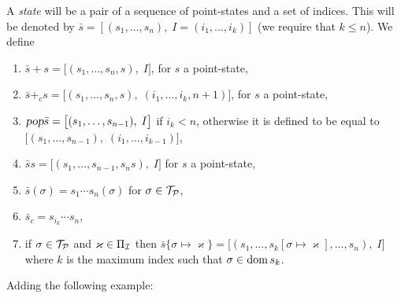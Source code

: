 \documentclass{llncs}
\newcommand{\ari}[1]{{\begin{mdframed}[linecolor=blue]{\color{blue}#1}\end{mdframed}}}
\begin{document}
A \textit{state} will be a pair of a sequence of point-states and a set of indices.
This will be denoted by $\bar s=[(s_1,\dots,s_n),\;I=(i_1,\dots,i_k)]$ (we require that $k\leq n$).
We define
\begin{enumerate}
    \item $\bar s+s=\bigl[(s_1,\dots,s_n,s),\;I\bigr]$, for $s$ a point-state,
    \item $\bar s+_cs=\bigl[(s_1,\dots,s_n,s),\;(i_1,\dots,i_k,n+1)\bigr]$, for $s$ a point-state,
    \item $\textsl{pop}\bar s=\bigl[(s_1,\dots,s_{n-1}),\;I\bigr]$ if $i_k<n$, otherwise it is defined to be equal to $\bigl[(s_1,\dots,s_{n-1}),\;(i_1,\dots,i_{k-1})\bigr]$,
    \item $\bar ss=\bigl[(s_1,\dots,s_{n-1},s_ns),\;I\bigr]$ for $s$ a point-state,
    \item $\bar s(\sigma)=s_1\cdots s_n(\sigma)$ for $\sigma\in\mathcal T_{\mathcal P}$,
    \item $\bar s_c=s_{i_k}\cdots s_n$,
    \item if $\sigma\in\mathcal T_{\mathcal P}$ and $\varkappa\in\Pi_{\mathcal I}$ then $\bar s\{\sigma\mapsto\varkappa\}=\bigl[(s_1,\dots,s_k[\sigma\mapsto\varkappa],\dots,s_n),\;I\bigr]$ where $k$ is the maximum index such that
    $\sigma\in\operatorname{dom} s_k$.
\end{enumerate}

\ari{Adding the following example:}
\end{document}
